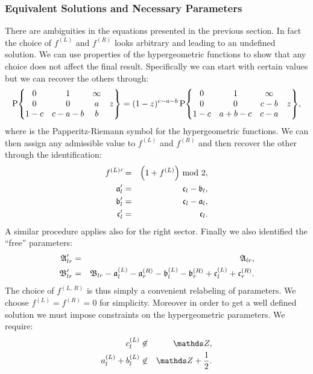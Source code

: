 \subsubsection{Equivalent Solutions and Necessary Parameters}

There are ambiguities in the equations presented in the previous section.
In fact the choice of $f^{(L)}$ and $f^{(R)}$ looks arbitrary and leading to an undefined solution.
We can use properties of the hypergeometric functions to show that any choice does not affect the final result.
Specifically we can start with certain values but we can recover the others through:
\begin{equation}
  \rP
  \qty{
    \mqty{
      0   & 1     & \infty &   \\
      0   & 0     & a      & z \\
      1-c & c-a-b & b      &
    }
  }
  =
  (1-z)^{c-a-b}\,
  \rP
  \qty{
    \mqty{
      0   & 1     & \infty &   \\
      0   & 0     & c-b    & z \\
      1-c & a+b-c & c-a    &
    }
  },
\end{equation}
where \rP is the Papperitz-Riemann symbol for the hypergeometric functions.
We can then assign any admissible value to $f^{(L)}$ and $f^{(R)}$ and then recover the other through the identification:
\begin{eqnarray}
  f^{(L)}{}' & = & \qty( 1 + f^{(L)} )~\text{mod}~2,
  \\
  \mathfrak{a}_l' & = & \mathfrak{c}_l - \mathfrak{b}_l,
  \\
  \mathfrak{b}_l' & = & \mathfrak{c}_l - \mathfrak{a}_l,
  \\
  \mathfrak{c}_l' & = &\mathfrak{c}_l.
\end{eqnarray}
A similar procedure applies also for the right sector.
Finally we also identified the ``free'' parameters:
\begin{eqnarray}
  \mathfrak{A}_{lr}'
  & = &
  \mathfrak{A}_{lr},
  \\
  \mathfrak{B}_{lr}'
  & = &
  \mathfrak{B}_{lr} - \mathfrak{a}^{(L)}_l - \mathfrak{a}^{(R)}_r - \mathfrak{b}^{(L)}_l - \mathfrak{b}^{(R)}_r + \mathfrak{c}^{(L)}_l + \mathfrak{c}^{(R)}_r.
\end{eqnarray}
The choice of $f^{(L,\,R)}$ is thus simply a convenient relabeling of parameters.
We choose $f^{(L)} = f^{(R)} = 0$ for simplicity.
Moreover in order to get a well defined solution we must impose constraints on the hypergeometric parameters.
We require:
\begin{eqnarray}
  c_l^{(L)} & \not\in & \Z,
  \\
  a_l^{(L)} + b_l^{(L)} & \not\in & \Z + \frac{1}{2}.
\end{eqnarray}

